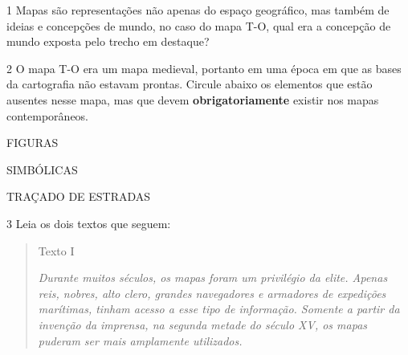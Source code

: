 \num{1} Mapas são representações não apenas do espaço geográfico, mas também
de ideias e concepções de mundo, no caso do mapa T-O, qual era a
concepção de mundo exposta pelo trecho em destaque?

\linhas[4]


\num{2} O mapa T-O era um mapa medieval, portanto em uma época em que as
bases da cartografia não estavam prontas.
Circule abaixo os elementos que estão ausentes nesse mapa, mas que devem
\textbf{obrigatoriamente} existir nos mapas contemporâneos.

\begin{multicols}{2}

FIGURAS


SIMBÓLICAS

TRAÇADO DE ESTRADAS
\end{multicols}


\num{3} Leia os dois textos que seguem:

\begin{quote}
Texto I

\emph{Durante muitos séculos, os mapas foram um privilégio da elite.
Apenas reis, nobres, alto clero, grandes navegadores e armadores de
expedições marítimas, tinham acesso a esse tipo de informação. Somente a
partir da invenção da imprensa, na segunda metade do século XV, os mapas
puderam ser mais amplamente utilizados.}

\end{quote}

